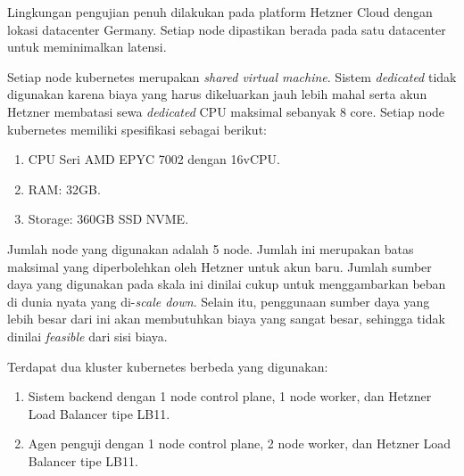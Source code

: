 Lingkungan pengujian penuh dilakukan pada platform Hetzner Cloud dengan lokasi datacenter Germany. Setiap node dipastikan berada pada satu datacenter untuk meminimalkan latensi.

Setiap node kubernetes merupakan \textit{shared virtual machine}. Sistem \textit{dedicated} tidak digunakan karena biaya yang harus dikeluarkan jauh lebih mahal serta akun Hetzner membatasi sewa \textit{dedicated} CPU maksimal sebanyak 8 core. Setiap node kubernetes memiliki spesifikasi sebagai berikut:

\begin{enumerate}
    \item CPU Seri AMD EPYC 7002 dengan 16vCPU.
    \item RAM: 32GB.
    \item Storage: 360GB SSD NVME.
\end{enumerate}

Jumlah node yang digunakan adalah 5 node. Jumlah ini merupakan batas maksimal yang diperbolehkan oleh Hetzner untuk akun baru. Jumlah sumber daya yang digunakan pada skala ini dinilai cukup untuk menggambarkan beban di dunia nyata yang di-\textit{scale down}. Selain itu, penggunaan sumber daya yang lebih besar dari ini akan membutuhkan biaya yang sangat besar, sehingga tidak dinilai \textit{feasible} dari sisi biaya.

Terdapat dua kluster kubernetes berbeda yang digunakan:

\begin{enumerate}
    \item Sistem backend dengan 1 node control plane, 1 node worker, dan Hetzner Load Balancer tipe LB11.
    \item Agen penguji dengan 1 node control plane, 2 node worker, dan Hetzner Load Balancer tipe LB11.
\end{enumerate}
